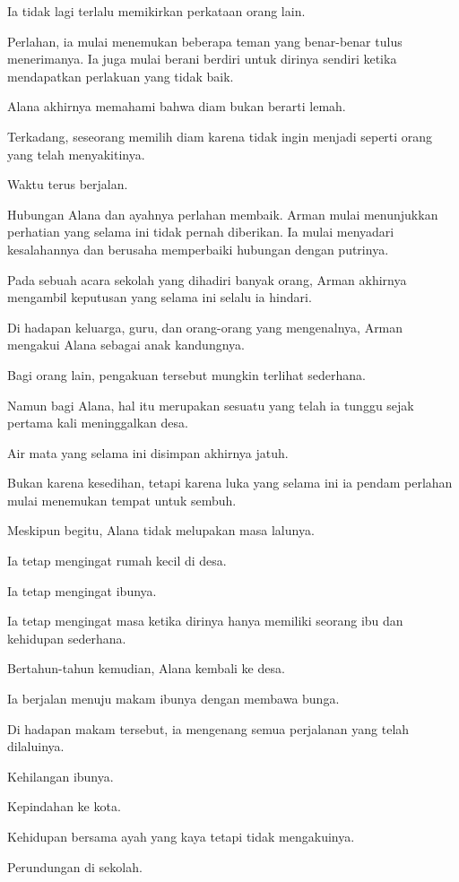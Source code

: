 Ia tidak lagi terlalu memikirkan perkataan orang lain.

Perlahan, ia mulai menemukan beberapa teman yang benar-benar tulus menerimanya. Ia juga mulai berani berdiri untuk dirinya sendiri ketika mendapatkan perlakuan yang tidak baik.

Alana akhirnya memahami bahwa diam bukan berarti lemah.

Terkadang, seseorang memilih diam karena tidak ingin menjadi seperti orang yang telah menyakitinya.

Waktu terus berjalan.

Hubungan Alana dan ayahnya perlahan membaik. Arman mulai menunjukkan perhatian yang selama ini tidak pernah diberikan. Ia mulai menyadari kesalahannya dan berusaha memperbaiki hubungan dengan putrinya.

Pada sebuah acara sekolah yang dihadiri banyak orang, Arman akhirnya mengambil keputusan yang selama ini selalu ia hindari.

Di hadapan keluarga, guru, dan orang-orang yang mengenalnya, Arman mengakui Alana sebagai anak kandungnya.

Bagi orang lain, pengakuan tersebut mungkin terlihat sederhana.

Namun bagi Alana, hal itu merupakan sesuatu yang telah ia tunggu sejak pertama kali meninggalkan desa.

Air mata yang selama ini disimpan akhirnya jatuh.

Bukan karena kesedihan, tetapi karena luka yang selama ini ia pendam perlahan mulai menemukan tempat untuk sembuh.

Meskipun begitu, Alana tidak melupakan masa lalunya.

Ia tetap mengingat rumah kecil di desa.

Ia tetap mengingat ibunya.

Ia tetap mengingat masa ketika dirinya hanya memiliki seorang ibu dan kehidupan sederhana.

Bertahun-tahun kemudian, Alana kembali ke desa.

Ia berjalan menuju makam ibunya dengan membawa bunga.

Di hadapan makam tersebut, ia mengenang semua perjalanan yang telah dilaluinya.

Kehilangan ibunya.

Kepindahan ke kota.

Kehidupan bersama ayah yang kaya tetapi tidak mengakuinya.

Perundungan di sekolah.

